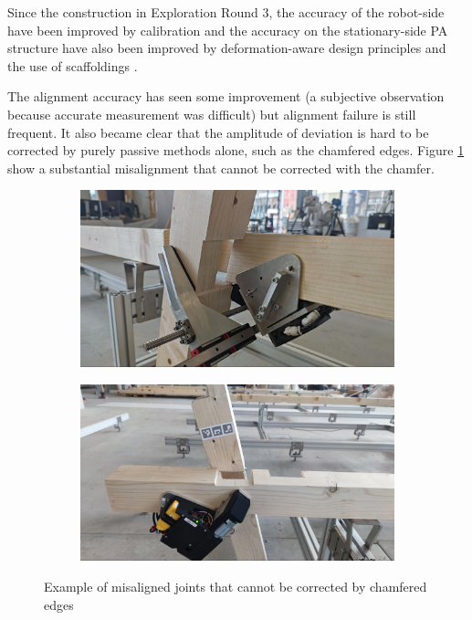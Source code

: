 Since the construction in Exploration Round 3, the accuracy of the robot-side have been improved by calibration  and the accuracy on the stationary-side PA structure have also been improved by deformation-aware design principles  and the use of scaffoldings .

The alignment accuracy has seen some improvement (a subjective observation because accurate measurement was difficult) but alignment failure is still frequent. It also became clear that the amplitude of deviation is hard to be corrected by purely passive methods alone, such as the chamfered edges. Figure \ref{fig:example-of-misaligned-joints} show a substantial misalignment that cannot be corrected with the chamfer. 

\begin{figure}[!h]
    \centering
    \begin{subfigure}[b]{0.49\textwidth}
        \centering
        \includegraphics[width=\textwidth]{images/08/img37.jpg}
    \end{subfigure}
    \hfill
    \begin{subfigure}[b]{0.49\textwidth}
        \centering
        \includegraphics[width=\textwidth]{images/08/img38.jpg}
    \end{subfigure}
    \caption{Example of misaligned joints that cannot be corrected by chamfered edges}
    \label{fig:example-of-misaligned-joints}
\end{figure}

